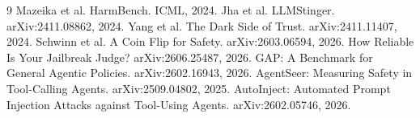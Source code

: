 \documentclass[10pt]{article}
\begin{document}
\begin{thebibliography}{9}
 Mazeika et al. HarmBench. ICML, 2024.
 Jha et al. LLMStinger. arXiv:2411.08862, 2024.
 Yang et al. The Dark Side of Trust. arXiv:2411.11407, 2024.
 Schwinn et al. A Coin Flip for Safety. arXiv:2603.06594, 2026.
 How Reliable Is Your Jailbreak Judge? arXiv:2606.25487, 2026.
 GAP: A Benchmark for General Agentic Policies. arXiv:2602.16943, 2026.
 AgentSeer: Measuring Safety in Tool-Calling Agents. arXiv:2509.04802, 2025.
 AutoInject: Automated Prompt Injection Attacks against Tool-Using Agents. arXiv:2602.05746, 2026.
\end{thebibliography}
\end{document}
